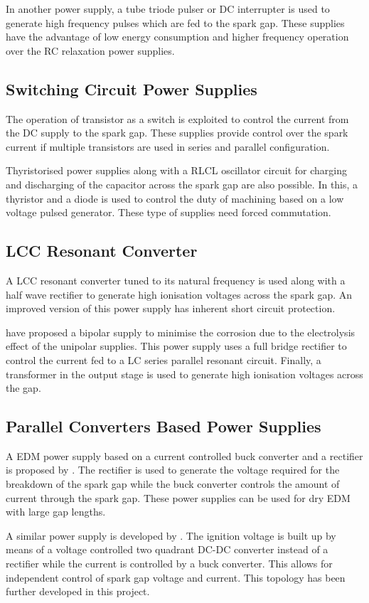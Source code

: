 	In another power supply, a tube triode pulser or DC interrupter is used to generate high frequency pulses which are fed to the spark gap. These supplies have the advantage of low energy consumption and higher frequency operation over the RC relaxation power supplies.
\subsection{Switching Circuit Power Supplies}
	The operation of transistor as a switch is exploited to control the current from the DC supply to the spark gap. These supplies provide control over the spark current if multiple transistors are used in series and parallel configuration.

	Thyristorised power supplies along with a RLCL oscillator circuit for charging and discharging of the capacitor across the spark gap are also possible. In this, a thyristor and a diode is used to control the duty of machining based on a low voltage pulsed generator. These type of supplies need forced commutation.
\subsection{LCC Resonant Converter}
	A LCC resonant converter tuned to its natural frequency is used along with a half wave rectifier to generate high ionisation voltages across the spark gap. An improved version of this power supply has inherent short circuit protection.\cite{sen2003developments}

	\citet{casanueva2008new} have proposed a bipolar supply to minimise the corrosion due to the electrolysis effect of the unipolar supplies. This power supply uses a full bridge rectifier to control the current fed to a LC series parallel resonant circuit. Finally, a transformer in the output stage is used to generate high ionisation voltages across the gap.

\subsection{Parallel Converters Based Power Supplies}
	A EDM power supply based on a current controlled buck converter and a rectifier is proposed by \citet{looser2010novel}. The rectifier is used to generate the voltage required for the breakdown of the spark gap while the buck converter controls the amount of current through the spark gap. These power supplies can be used for dry EDM with large gap lengths.
	
	A similar power supply is developed by \citet{tastekin2009novel}. The ignition voltage is built up by means of a voltage controlled two quadrant DC-DC converter instead of a rectifier while the current is controlled by a buck converter. This allows for independent control of spark gap voltage and current. This topology has been further developed in this project.
